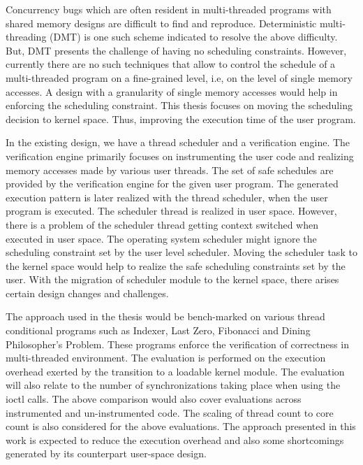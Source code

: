 Concurrency bugs which are often resident in multi-threaded programs with shared memory designs are difficult to find and reproduce. 
Deterministic multi-threading (DMT) is one such scheme indicated to resolve the above difficulty. 
But, DMT presents the challenge of having no scheduling constraints.  
However, currently there are no such techniques that allow to control the schedule of a multi-threaded program on a fine-grained level, i.e, on the level of single memory accesses. 
A design with a granularity of single memory accesses would help in enforcing the scheduling constraint. 
This thesis focuses on moving the scheduling decision to kernel space. 
Thus, improving the execution time of the user program.

In the existing design, we have a thread scheduler and a verification engine.  
The verification engine primarily focuses on instrumenting the user code and realizing memory accesses made by various user threads. 
The set of safe schedules are provided by the verification engine for the given user program. 
The generated execution pattern is later realized with the thread scheduler, when the user program is executed. 
The scheduler thread is realized in user space. 
However, there is a problem of the scheduler thread getting context switched when executed in user space. 
The operating system scheduler might ignore the scheduling constraint set by the user level scheduler. 
Moving the scheduler task to the kernel space would help to realize the safe scheduling constraints set by the user. 
With the migration of scheduler module to the kernel space, there arises certain design changes and challenges. 

The approach used in the thesis would be bench-marked on various thread conditional programs such as Indexer, Last Zero, Fibonacci and Dining Philosopher's Problem. 
These programs enforce the verification of correctness in multi-threaded environment. 
The evaluation is performed on the execution overhead exerted by the transition to a loadable kernel module. 
The evaluation will also relate to the number of synchronizations taking place when using the ioctl calls. 
The above comparison would also cover evaluations across instrumented and un-instrumented code. 
The scaling of thread count to core count is also considered for the above evaluations. 
The approach presented in this work is expected to reduce the execution overhead and also some shortcomings generated by its counterpart user-space design. 